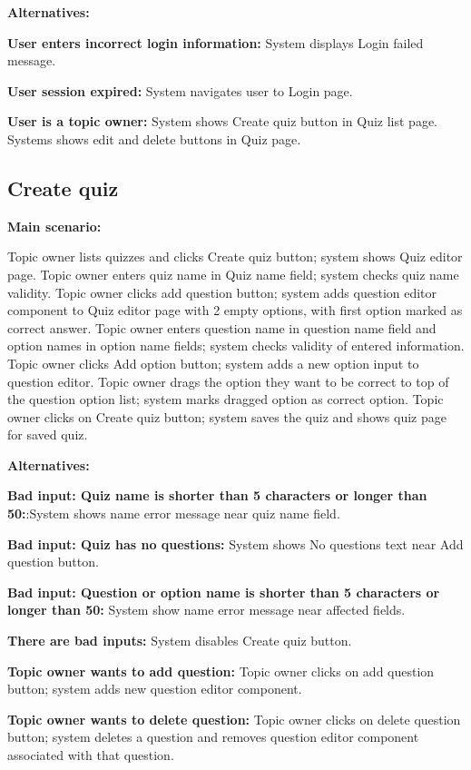 \documentclass[
    english, %
]{VUMIFPSkursinis}
\begin{document}
\noindent\textbf{\fontsize{13}{15}\selectfont Alternatives:}

\textbf{User enters incorrect login information:} System displays Login failed message.

\textbf{User session expired:} System navigates user to Login page.

\textbf{User is a topic owner:} System shows Create quiz button in Quiz list page. Systems shows edit and delete buttons in Quiz page.

\subsection{Create quiz}

\noindent\textbf{\fontsize{13}{15}\selectfont Main scenario:}

Topic owner lists quizzes and clicks Create quiz button; system shows Quiz editor page. Topic owner enters quiz name in Quiz name field; system checks quiz name validity. Topic owner clicks add question button; system adds question editor component to Quiz editor page with 2 empty options, with first option marked as correct answer. Topic owner enters question name in question name field and option names in option name fields; system checks validity of entered information. Topic owner clicks Add option button; system adds a new option input to question editor. Topic owner drags the option they want to be correct to top of the question option list; system marks dragged option as correct option. Topic owner clicks on Create quiz button; system saves the quiz and shows quiz page for saved quiz.

\noindent\textbf{\fontsize{13}{15}\selectfont Alternatives:}

\textbf{Bad input: Quiz name is shorter than 5 characters or longer than 50:}:System shows name error message near quiz name field.

\textbf{Bad input: Quiz has no questions:} System shows No questions text near Add question button.

\textbf{Bad input: Question or option name is shorter than 5 characters or longer than 50:} System show name error message near affected fields.

\textbf{There are bad inputs:} System disables Create quiz button.

\textbf{Topic owner wants to add question:} Topic owner clicks on add question button; system adds new question editor component.

\textbf{Topic owner wants to delete question:} Topic owner clicks on delete question button; system deletes a question and removes question editor component associated with that question.
\end{document}
